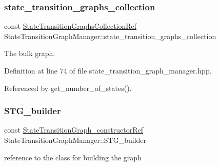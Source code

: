 \mbox{\label{classStateTransitionGraphManager_a439f79c2fa146206de821722e8e900fc}} 
\subsubsection{\texorpdfstring{state\+\_\+transition\+\_\+graphs\+\_\+collection}{state\_transition\_graphs\_collection}}
{\footnotesize\ttfamily const \hyperlink{state__transition__graph_8hpp_a2613a37dfdde13c61d36bfaba91f433e}{State\+Transition\+Graphs\+Collection\+Ref} State\+Transition\+Graph\+Manager\+::state\+\_\+transition\+\_\+graphs\+\_\+collection\hspace{0.3cm}{\ttfamily [private]}}



The bulk graph. 



Definition at line 74 of file state\+\_\+transition\+\_\+graph\+\_\+manager.\+hpp.



Referenced by get\+\_\+number\+\_\+of\+\_\+states().

\mbox{\label{classStateTransitionGraphManager_a7abab219af3706cd4fb87ecbd59d4c31}} 
\subsubsection{\texorpdfstring{S\+T\+G\+\_\+builder}{STG\_builder}}
{\footnotesize\ttfamily const \hyperlink{StateTransitionGraph__constructor_8hpp_a81ec81bc89e64a6183a9e272293e8373}{State\+Transition\+Graph\+\_\+constructor\+Ref} State\+Transition\+Graph\+Manager\+::\+S\+T\+G\+\_\+builder}



reference to the class for building the graph 



